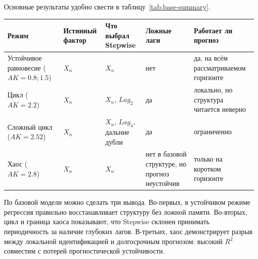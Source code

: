 Основные результаты удобно свести в таблицу~\ref{tab:base-summary}.

\begin{center}
\label{tab:base-summary}
\end{center}

{\def\LTcaptype{none} %
\begin{longtable}[]{@{}
  >{\raggedright\arraybackslash}p{}
  >{\raggedright\arraybackslash}p{}
  >{\raggedright\arraybackslash}p{}
  >{\raggedright\arraybackslash}p{}
  >{\raggedright\arraybackslash}p{}@{}}
\toprule\noalign{}
\begin{minipage}[b]{\linewidth}\raggedright
Режим
\end{minipage} & \begin{minipage}[b]{\linewidth}\raggedright
Истинный фактор
\end{minipage} & \begin{minipage}[b]{\linewidth}\raggedright
Что выбрал Stepwise
\end{minipage} & \begin{minipage}[b]{\linewidth}\raggedright
Ложные лаги
\end{minipage} & \begin{minipage}[b]{\linewidth}\raggedright
Работает ли прогноз
\end{minipage} \\
\midrule\noalign{}
\endhead
\bottomrule\noalign{}
\endlastfoot
Устойчивое равновесие (\(AK=0.8; 1.5\)) & \(X_n\) & \(X_n\) & нет & да, на всём рассматриваемом горизонте \\
Цикл (\(AK=2.2\)) & \(X_n\) & \(X_n\), \(Lag_2\) & да & локально, но структура читается неверно \\
Сложный цикл (\(AK=2.52\)) & \(X_n\) & \(X_n\), \(Lag_4\), дальние дубли & да & ограниченно \\
Хаос (\(AK=2.8\)) & \(X_n\) & \(X_n\) & нет в базовой структуре, но прогноз неустойчив & только на коротком горизонте \\
\end{longtable}
}

По базовой модели можно сделать три вывода. Во-первых, в устойчивом режиме регрессия правильно восстанавливает структуру без ложной памяти. Во-вторых, цикл и граница хаоса показывают, что Stepwise склонен принимать периодичность за наличие глубоких лагов. В-третьих, хаос демонстрирует разрыв между локальной идентификацией и долгосрочным прогнозом: высокий \(R^2\) совместим с потерей прогностической устойчивости.

